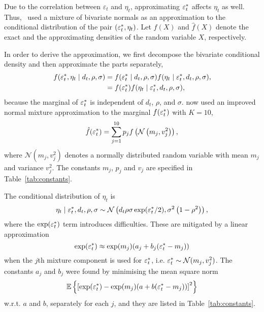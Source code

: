 Due to the correlation between $\varepsilon_t$ and $\eta_t$, approximating $\varepsilon_t^\ast$ affects $\eta_t$ as well.
Thus,~\citeauthor{Omori2007} used a mixture of bivariate normals as an approximation to the conditional distribution of the pair $(\varepsilon_t^\ast, \eta_t)$.
Let $f(X)$ and $\hat f(X)$ denote the exact and the approximating densities of the random variable $X$, respectively.

In order to derive the approximation, we first decompose the bivariate conditional density and then approximate the parts separately,
\begin{align}
f(\varepsilon_t^\ast,\eta_t\mid d_t,\rho,\sigma) &= f(\varepsilon_t^\ast\mid d_t,\rho,\sigma)f(\eta_t\mid\varepsilon_t^\ast,d_t,\rho,\sigma),\nonumber \\
&= f(\varepsilon_t^\ast)f(\eta_t\mid\varepsilon_t^\ast,d_t,\rho,\sigma)\label{eq:decomp},
\end{align}
because the marginal of $\varepsilon_t^\ast$ is independent of $d_t$, $\rho$, and $\sigma$.
\citeauthor{Omori2007} now used an improved normal mixture approximation to the marginal $f(\varepsilon_t^\ast)$ with $K=10$,
\begin{equation}\label{eq:ets}
\hat f(\varepsilon_t^\ast)=\sum_{j=1}^{10}p_jf\left(\mathcal{N}\left(m_j,v_j^2\right)\right),
\end{equation}
where $\mathcal{N}\left(m_j,v_j^2\right)$ denotes a normally distributed random variable with mean $m_j$ and variance $v_j^2$.
The constants $m_j$, $p_j$ and $v_j$ are specified in Table~\ref{tab:constants}.

The conditional distribution of $\eta_t$ is
\begin{equation}\label{eq:eta}
\eta_t\mid\varepsilon_t^\ast,d_t,\rho,\sigma\sim\mathcal{N}\left(d_t\rho\sigma\exp(\varepsilon_t^\ast/2),\sigma^2\left(1-\rho^2\right)\right),
\end{equation}
where the $\exp(\varepsilon_t^\ast)$ term introduces difficulties.
These are mitigated by a linear approximation
\begin{equation}\label{eq:etslinear}
\exp(\varepsilon_t^\ast)\approx\exp(m_j)(a_j+b_j(\varepsilon_t^\ast-m_j))
\end{equation}
when the $j$th mixture component is used for $\varepsilon_t^\ast$, i.e. $\varepsilon_t^\ast\sim\mathcal{N}(m_j,v_j^2)$.
The constants $a_j$ and $b_j$ were found by minimising the mean square norm 
\begin{equation*}
\mathbb{E}\left\{\left[\exp(\varepsilon_t^\ast)-\exp(m_j)(a+b(\varepsilon_t^\ast-m_j))\right]^2\right\}
\end{equation*}
w.r.t. $a$ and $b$, separately for each $j$, and they are listed in Table~\ref{tab:constants}.


